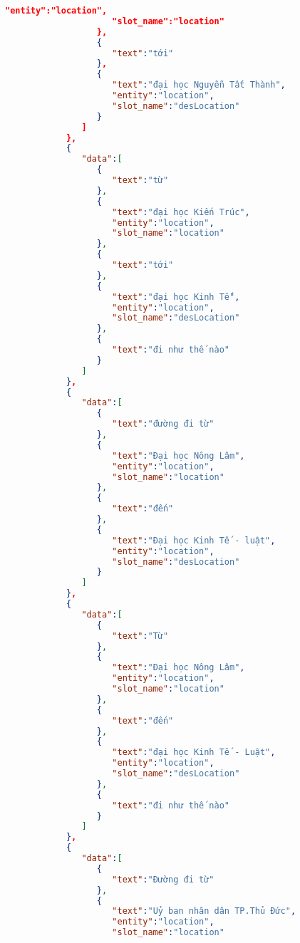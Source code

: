 \begin{lstlisting}[language=json,firstnumber=1]
                     "entity":"location",
                     "slot_name":"location"
                  },
                  {
                     "text":"tới"
                  },
                  {
                     "text":"đại học Nguyễn Tất Thành",
                     "entity":"location",
                     "slot_name":"desLocation"
                  }
               ]
            },
            {
               "data":[
                  {
                     "text":"từ"
                  },
                  {
                     "text":"đại học Kiến Trúc",
                     "entity":"location",
                     "slot_name":"location"
                  },
                  {
                     "text":"tới"
                  },
                  {
                     "text":"đại học Kinh Tế",
                     "entity":"location",
                     "slot_name":"desLocation"
                  },
                  {
                     "text":"đi như thế nào"
                  }
               ]
            },
            {
               "data":[
                  {
                     "text":"đường đi từ"
                  },
                  {
                     "text":"Đại học Nông Lâm",
                     "entity":"location",
                     "slot_name":"location"
                  },
                  {
                     "text":"đến"
                  },
                  {
                     "text":"Đại học Kinh Tế - luật",
                     "entity":"location",
                     "slot_name":"desLocation"
                  }
               ]
            },
            {
               "data":[
                  {
                     "text":"Từ"
                  },
                  {
                     "text":"Đại học Nông Lâm",
                     "entity":"location",
                     "slot_name":"location"
                  },
                  {
                     "text":"đến"
                  },
                  {
                     "text":"đại học Kinh Tế - Luật",
                     "entity":"location",
                     "slot_name":"desLocation"
                  },
                  {
                     "text":"đi như thế nào"
                  }
               ]
            },
            {
               "data":[
                  {
                     "text":"Đường đi từ"
                  },
                  {
                     "text":"Uỷ ban nhân dân TP.Thủ Đức",
                     "entity":"location",
                     "slot_name":"location"

\end{lstlisting}
